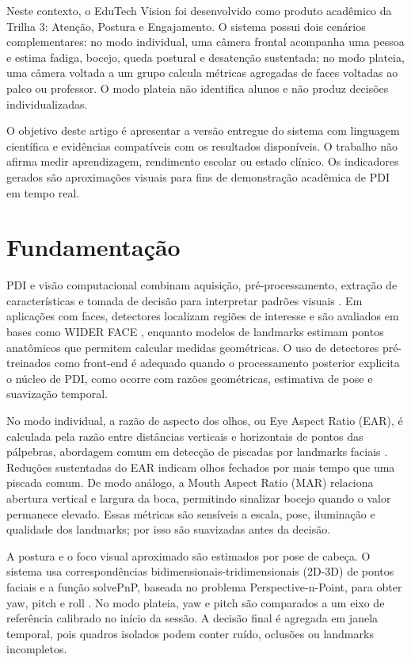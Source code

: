 \documentclass[12pt]{article}
\begin{document}
Neste contexto, o EduTech Vision foi desenvolvido como produto acadêmico da Trilha 3: Atenção, Postura e Engajamento. O sistema possui dois cenários complementares: no modo individual, uma câmera frontal acompanha uma pessoa e estima fadiga, bocejo, queda postural e desatenção sustentada; no modo plateia, uma câmera voltada a um grupo calcula métricas agregadas de faces voltadas ao palco ou professor. O modo plateia não identifica alunos e não produz decisões individualizadas.

O objetivo deste artigo é apresentar a versão entregue do sistema com linguagem científica e evidências compatíveis com os resultados disponíveis. O trabalho não afirma medir aprendizagem, rendimento escolar ou estado clínico. Os indicadores gerados são aproximações visuais para fins de demonstração acadêmica de PDI em tempo real.

\section{Fundamentação}

PDI e visão computacional combinam aquisição, pré-processamento, extração de características e tomada de decisão para interpretar padrões visuais \cite{gonzalez2018,szeliski2022}. Em aplicações com faces, detectores localizam regiões de interesse e são avaliados em bases como WIDER FACE \cite{yang2016}, enquanto modelos de landmarks estimam pontos anatômicos que permitem calcular medidas geométricas. O uso de detectores pré-treinados como front-end é adequado quando o processamento posterior explicita o núcleo de PDI, como ocorre com razões geométricas, estimativa de pose e suavização temporal.

No modo individual, a razão de aspecto dos olhos, ou Eye Aspect Ratio (EAR), é calculada pela razão entre distâncias verticais e horizontais de pontos das pálpebras, abordagem comum em detecção de piscadas por landmarks faciais \cite{soukupova2016}. Reduções sustentadas do EAR indicam olhos fechados por mais tempo que uma piscada comum. De modo análogo, a Mouth Aspect Ratio (MAR) relaciona abertura vertical e largura da boca, permitindo sinalizar bocejo quando o valor permanece elevado. Essas métricas são sensíveis a escala, pose, iluminação e qualidade dos landmarks; por isso são suavizadas antes da decisão.

A postura e o foco visual aproximado são estimados por pose de cabeça. O sistema usa correspondências bidimensionais-tridimensionais (2D-3D) de pontos faciais e a função solvePnP, baseada no problema Perspective-n-Point, para obter yaw, pitch e roll \cite{lepetit2009}. No modo plateia, yaw e pitch são comparados a um eixo de referência calibrado no início da sessão. A decisão final é agregada em janela temporal, pois quadros isolados podem conter ruído, oclusões ou landmarks incompletos.
\end{document}
